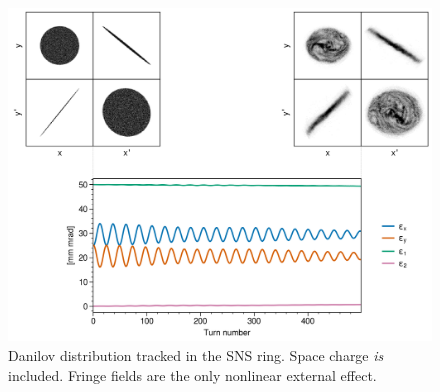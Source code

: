 \begin{figure}[!p]
    \centering
    \includegraphics[width=\textwidth]{Images/chapter3/fringe_spacecharge.png}
    \caption{Danilov distribution tracked in the SNS ring. Space charge \textit{is} included. Fringe fields are the only nonlinear external effect.}
    \label{fig:fringe_c}
    \vspace*{3cm}
\end{figure}